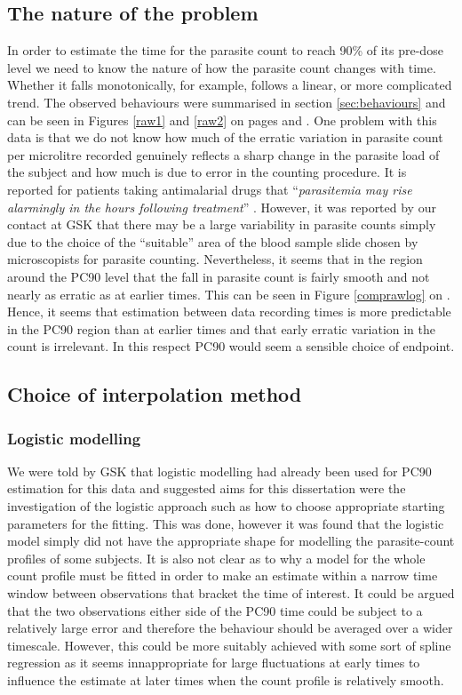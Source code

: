 \subsection{The nature of the problem}
In order to estimate the time for the parasite count to reach 90\% of its pre-dose level we need to know the nature of how the parasite count changes with time. Whether it falls monotonically, for example, follows a linear, or more complicated trend. The observed behaviours were summarised in section \ref{sec:behaviours} and can be seen in Figures \ref{raw1} and \ref{raw2} on pages \pageref{raw1} and \pageref{raw2}. One problem with this data is that we do not know how much of the erratic variation in parasite count per microlitre recorded genuinely reflects a sharp change in the parasite load of the subject and how much is due to error in the counting procedure. It is reported for patients taking antimalarial drugs that ``\textit{parasitemia may rise alarmingly in the hours following treatment}'' \cite{white}. However, it was reported by our contact at GSK that there may be a large variability in parasite counts simply due to the choice of the ``suitable'' area of the blood sample slide chosen by microscopists for parasite counting. Nevertheless, it seems that in the region around the PC90 level that the fall in parasite count is fairly smooth and not nearly as erratic as at earlier times. This can be seen in Figure \ref{comprawlog} on \pageref{comprawlog}. Hence, it seems that estimation between data recording times is more predictable in the PC90 region than at earlier times and that early erratic variation in the count is irrelevant. In this respect PC90 would seem a sensible choice of endpoint.
\subsection{Choice of interpolation method}
\subsubsection*{Logistic modelling}
We were told by GSK that logistic modelling had already been used for PC90 estimation for this data and suggested aims for this dissertation were the investigation of the logistic approach such as how to choose appropriate starting parameters for the fitting. This was done, however it was found that the logistic model simply did not have the appropriate shape for modelling the parasite-count profiles of some subjects. It is also not clear as to why a model for the whole count profile must be fitted in order to make an estimate within a narrow time window between observations that bracket the time of interest. It could be argued that the two observations either side of the PC90 time could be subject to a relatively large error and therefore the behaviour should be averaged over a wider timescale. However, this could be more suitably achieved with some sort of spline regression as it seems innappropriate for large fluctuations at early times to influence the estimate at later times when the count profile is relatively smooth.

